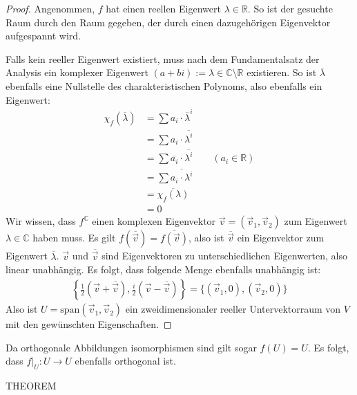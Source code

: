 \documentclass{report}
\newcommand*{\newpar}{\par\vspace{\baselineskip}\noindent}
\newcommand{\bC}{\mathbb{C}}
\newcommand{\bR}{\mathbb{R}}
\newcommand{\vv}{\vec{v}}
\begin{document}
\begin{proof}
 Angenommen, $f$ hat einen reellen Eigenwert $\lambda \in \bR$. So ist der gesuchte Raum durch den Raum gegeben, der durch einen dazugehörigen Eigenvektor aufgespannt wird.
 \newpar
 Falls kein reeller Eigenwert existiert, muss nach dem Fundamentalsatz der Analysis ein komplexer Eigenwert $(a + bi) := \lambda \in \bC \setminus \bR$ existieren. So ist $\overline{\lambda}$ ebenfalls eine Nullstelle des charakteristischen Polynoms, also ebenfalls ein Eigenwert:
 \begin{align*}
  \chi_f(\overline{\lambda}) &= \sum a_i \cdot \overline{\lambda}^i\\
                             &= \sum a_i \cdot \overline{\lambda^i}\\
                             &= \sum \overline{a_i} \cdot \overline{\lambda^i} \qquad (a_i \in \bR)\\
                             &= \sum \overline{a_i \cdot \lambda^i}\\
                             &= \overline{\chi_f(\lambda)}\\
                             &= 0
 \end{align*}
 Wir wissen, dass $f^\bC$ einen komplexen Eigenvektor $\vv = (\vv_1, \vv_2)$ zum Eigenwert $\lambda \in \bC$ haben muss. Es gilt $f(\overline{\vv}) = \overline{f(\vv)}$, also ist $\overline{\vv}$ ein Eigenvektor zum Eigenwert $\overline{\lambda}$. $\vv$ und $\overline{\vv}$ sind Eigenvektoren zu unterschiedlichen Eigenwerten, also linear unabhängig. Es folgt, dass folgende Menge ebenfalls unabhängig ist:
 \begin{align*}
  \left\{\frac{1}{2}(\vv + \overline{\vv}), \frac{i}{2}(\vv - \overline{\vv})\right\} = \{(\vv_1,0),(\vv_2,0)\}
 \end{align*}
 Also ist $U = \text{span}(\vv_1, \vv_2)$ ein zweidimensionaler reeller Untervektorraum von $V$ mit den gewünschten Eigenschaften.
\end{proof}
\noindent
Da orthogonale Abbildungen isomorphismen sind gilt sogar $f(U) = U$. Es folgt, dass $f|_U : U \to U$ ebenfalls orthogonal ist.
\clearpage
[...]
\clearpage
\begin{theorem}
 THEOREM
\end{theorem}
\end{document}
